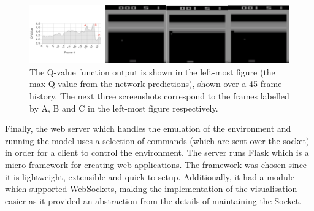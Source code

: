 \begin{figure}[htbp]
	\centering
	\includegraphics[width=1\textwidth]{chapters/chapter4/images/qvalue-plot.png}
	\caption[Q-Value function visualisation]{The Q-value function output is shown in the left-most figure (the max Q-value from the network predictions), shown over a 45 frame history. The next three screenshots correspond to the frames labelled by A, B and C in the left-most figure respectively.
		\label{fig:q-value-plot}
	}
\end{figure}

Finally, the web server which handles the emulation of the environment and running the model uses a selection of commands (which are sent over the socket) in order for a client to control the environment. The server runs Flask which is a micro-framework for creating web applications. The framework was chosen since it is lightweight, extensible and quick to setup. Additionally, it had a module which supported WebSockets, making the implementation of the visualisation easier as it provided an abstraction from the details of maintaining the Socket.